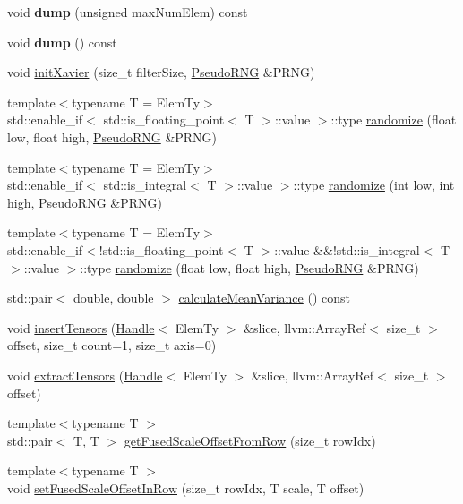 \begin{DoxyCompactItemize}
void {\bfseries dump} (unsigned max\+Num\+Elem) const
\item 
\mbox{\label{classglow_1_1_handle_a73265b9bb46df7b521110d93b3777708}} 
void {\bfseries dump} () const
\item 
void \hyperlink{classglow_1_1_handle_aebb37b02423e68e306cd4e0067e8689e}{init\+Xavier} (size\+\_\+t filter\+Size, \hyperlink{classglow_1_1_pseudo_r_n_g}{Pseudo\+R\+NG} \&P\+R\+NG)
\item 
{\footnotesize template$<$typename T  = Elem\+Ty$>$ }\\std\+::enable\+\_\+if$<$ std\+::is\+\_\+floating\+\_\+point$<$ T $>$\+::value $>$\+::type \hyperlink{classglow_1_1_handle_aba569359ae39c17970cbfba5bbb6fa79}{randomize} (float low, float high, \hyperlink{classglow_1_1_pseudo_r_n_g}{Pseudo\+R\+NG} \&P\+R\+NG)
\item 
{\footnotesize template$<$typename T  = Elem\+Ty$>$ }\\std\+::enable\+\_\+if$<$ std\+::is\+\_\+integral$<$ T $>$\+::value $>$\+::type \hyperlink{classglow_1_1_handle_a7b66d372800e15c009ee8d4aae8d32c2}{randomize} (int low, int high, \hyperlink{classglow_1_1_pseudo_r_n_g}{Pseudo\+R\+NG} \&P\+R\+NG)
\item 
{\footnotesize template$<$typename T  = Elem\+Ty$>$ }\\std\+::enable\+\_\+if$<$!std\+::is\+\_\+floating\+\_\+point$<$ T $>$\+::value \&\&!std\+::is\+\_\+integral$<$ T $>$\+::value $>$\+::type \hyperlink{classglow_1_1_handle_afc9f5d40382d7db26e117c2e7b3636a3}{randomize} (float low, float high, \hyperlink{classglow_1_1_pseudo_r_n_g}{Pseudo\+R\+NG} \&P\+R\+NG)
\item 
std\+::pair$<$ double, double $>$ \hyperlink{classglow_1_1_handle_a542bc11508e42c8e2d2b1d2b07a40e8d}{calculate\+Mean\+Variance} () const
\item 
void \hyperlink{classglow_1_1_handle_a8e46eccc2e9bd998d798f19f368cf400}{insert\+Tensors} (\hyperlink{classglow_1_1_handle}{Handle}$<$ Elem\+Ty $>$ \&slice, llvm\+::\+Array\+Ref$<$ size\+\_\+t $>$ offset, size\+\_\+t count=1, size\+\_\+t axis=0)
\item 
void \hyperlink{classglow_1_1_handle_ae4ce4936e95b70768a705074098e0f30}{extract\+Tensors} (\hyperlink{classglow_1_1_handle}{Handle}$<$ Elem\+Ty $>$ \&slice, llvm\+::\+Array\+Ref$<$ size\+\_\+t $>$ offset)
\item 
{\footnotesize template$<$typename T $>$ }\\std\+::pair$<$ T, T $>$ \hyperlink{classglow_1_1_handle_ae8cf4cea87ecab8304875b1b609a6591}{get\+Fused\+Scale\+Offset\+From\+Row} (size\+\_\+t row\+Idx)
\item 
{\footnotesize template$<$typename T $>$ }\\void \hyperlink{classglow_1_1_handle_a885d9052ce52d0125e99e47b45bc5fcc}{set\+Fused\+Scale\+Offset\+In\+Row} (size\+\_\+t row\+Idx, T scale, T offset)
\end{DoxyCompactItemize}
